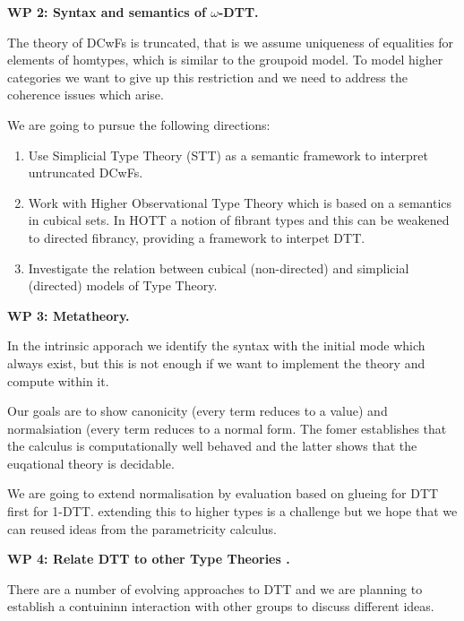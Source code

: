 \documentclass[a4paper,11pt]{article}
\renewcommand{\paragraph}[1]{\textbf{#1.}}
\begin{document}
\paragraph{WP 2: Syntax and semantics of $\omega$-DTT}

The theory of DCwFs is truncated, that is we assume uniqueness of
equalities for elements of homtypes, which is similar to the groupoid
model. To model higher categories we want to give up this restriction
and we need to address the coherence issues which arise.

We are going to pursue the following directions:
\begin{enumerate}
\item Use Simplicial Type Theory (STT) as a semantic framework to
  interpret untruncated DCwFs.
\item  Work with Higher Observational Type Theory which is based on a
  semantics in cubical sets. In HOTT a notion of fibrant types and
  this can be weakened to directed fibrancy, providing a framework to
  interpet DTT.
\item Investigate the relation between cubical (non-directed) and
  simplicial (directed) models of Type Theory.
\end{enumerate}

\paragraph{WP 3: Metatheory}

In the intrinsic apporach we identify the syntax with the initial mode
which always exist, but this is not enough if we want to implement the
theory and compute within it. 

Our goals are to show canonicity (every term reduces to a value) and
normalsiation (every term reduces to a normal form. The fomer
establishes that the calculus is computationally well behaved and 
the latter shows that the euqational theory is decidable.

We are going to extend normalisation by evaluation based on glueing
for DTT first for 1-DTT. extending this to higher types is a challenge
but we hope that we can reused ideas from the parametricity calculus. 

\paragraph{WP 4: Relate DTT to other Type Theories }

There are a number of evolving approaches to DTT and we are planning
to establish a contuininn interaction with other groups to discuss
different ideas.
\end{document}
